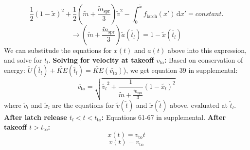 \documentclass[12pt]{article}
\begin{document}
\[
    \frac{1}{2}(1-\tilde{x})^2 + \frac{1}{2}\left(\tilde{m} + \frac{\tilde{m}_{\text{spr}}}{3} \right)\tilde{v}^2 - \int_0^{\tilde{x}} \! f_{\text{latch}}(x') \, \mathrm{d}x' = constant. 
\]
\[
    \rightarrow \left(\tilde{m} + \frac{\tilde{m}_{\text{spr}}}{3} \right)\tilde{a}(\tilde{t_l}) = 1 - \tilde{x}(\tilde{t_l})
\]
We can substitude the equations for $x(t)$ and $a(t)$ above into this expression, and solve for $t_l$.
\newline 
\newline
\noindent \textbf{Solving for velocity at takeoff $v_{\text{to}}$:}
\newline
Based on conservation of energy: $\tilde{U}(\tilde{t_l}) + \tilde{KE}(\tilde{t_l}) = \tilde{KE}(\tilde{v_{\text{to}}})$), we get equation 39 in supplemental:
\[
    \tilde{v_{\text{to}}} = \sqrt{\tilde{v_l}^2 + \frac{1}{\tilde{m} + \frac{\tilde{m}_{\text{spr}}}{3}} (1 - \tilde{x_l})^2}
\]
where $\tilde{v}_l$ and $\tilde{x}_l$ are the equations for $\tilde{v}(\tilde{t})$ and $\tilde{x}(\tilde{t})$ above, evaluated at $\tilde{t}_l$.
\newline 
\newline
\noindent \textbf{After latch release $t_l < t < t_{\text{to}}$:}
\newline
Equations 61-67 in supplemental.
\newline
\newline
\noindent \textbf{After takeoff $t > t_{\text{to}}$:}
\[
    x(t) = v_{\text{to}}t
\]
\[
    v(t) = v_{\text{to}}
\]
\end{document}

